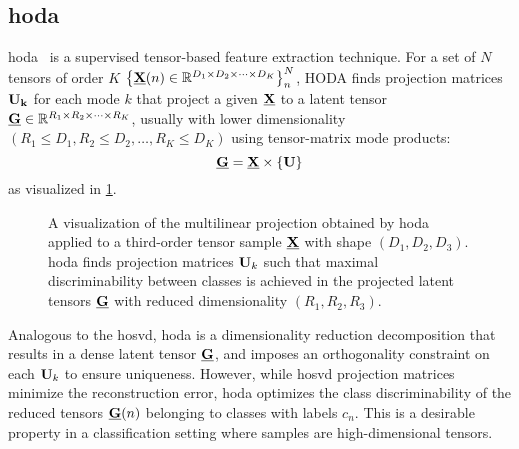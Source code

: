 \documentclass[twocolumn]{article}
\begin{document}
\subsection{\Acl{hoda}}
\Acf{hoda}~\cite{Phan2010} is a
supervised tensor-based feature extraction technique.
For a set of $N$ tensors of order $K$
$\left\{\underline{\mathbf{X}}(n)\in\mathbb{R}^{D_1\times D_2 \times \cdots \times
		D_K}\right\}_n^N$, HODA finds projection matrices $\mathbf{U_k}$ for each mode $k$
that project a given $\underline{\mathbf{X}}$ to a latent tensor
$\underline{\mathbf{G}}\in\mathbb{R}^{R_1\times R_2\times\cdots\times R_K}$, usually with lower
dimensionality $(R_1\leq D_1,R_2\leq D_2,\ldots,R_K\leq D_K)$ using
tensor-matrix mode products:
\begin{equation}
	\underline{\mathbf{G}}  = \underline{\mathbf{X}}\times\left\{\mathbf{U}\right\}
	\label{eq:HODA-backward}
\end{equation}
as visualized in \cref{fig:hoda-backward}.
\begin{figure}[t]
	\centering
	
	\caption[A \acs{hoda} backward projection.]{%
		A visualization of the multilinear projection obtained by \acf{hoda} applied to a third-order tensor
		sample $\underline{\mathbf{X}}$ with shape $(D_1,D_2, D_3)$.
		\Ac{hoda} finds projection matrices $\mathbf{U}_k$ such that maximal
		discriminability between classes is achieved in the projected latent tensors
		$\underline{\mathbf{G}}$ with reduced dimensionality $(R_1,R_2,R_3)$.}
	\label{fig:hoda-backward}%
\end{figure}

Analogous to the \ac{hosvd}, \ac{hoda} is a dimensionality
reduction decomposition that results in a dense latent tensor $\underline{\mathbf{G}}$, and
imposes an orthogonality constraint on each $\mathbf{U}_k$ to ensure uniqueness.
However, while \ac{hosvd} projection matrices minimize the reconstruction error,
\ac{hoda} optimizes the class discriminability of the reduced tensors
$\underline{\mathbf{G}}(n)$ belonging to classes with labels $c_n$.
This is a desirable property in a classification setting where samples are
high-dimensional tensors.
\end{document}
